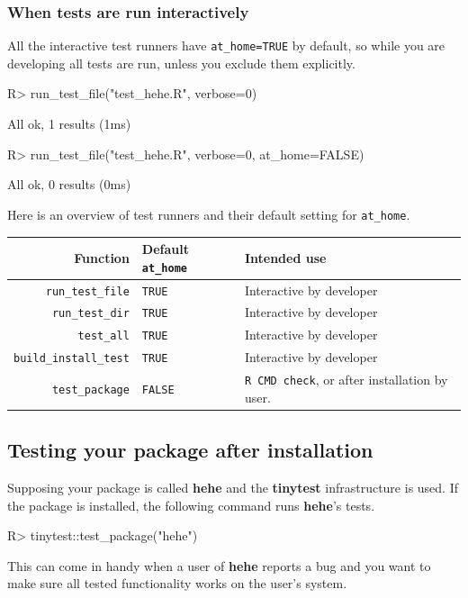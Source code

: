 \documentclass[11pt]{article}
\newcommand{\code}[1]{\texttt{#1}}
\newcommand{\pkg}[1]{\textbf{#1}}
\begin{document}
\subsubsection*{When tests are run interactively}
All the interactive test runners have \code{at\_home=TRUE} by default, so while
you are developing all tests are run, unless you exclude them explicitly.
\begin{Schunk}
\begin{Sinput}
R> run_test_file("test_hehe.R", verbose=0)
\end{Sinput}
\begin{Soutput}
All ok, 1 results (1ms)
\end{Soutput}
\begin{Sinput}
R> run_test_file("test_hehe.R", verbose=0, at_home=FALSE)
\end{Sinput}
\begin{Soutput}
All ok, 0 results (0ms)
\end{Soutput}
\end{Schunk}

Here is an overview of test runners and their default setting for \code{at\_home}.

\begin{center}
\begin{tabular}{rll}
Function               & Default \code{at\_home}  & Intended use \\
\hline
\code{run\_test\_file}      & \code{TRUE}   & Interactive by developer\\
\code{run\_test\_dir}       & \code{TRUE}   & Interactive by developer\\
\code{test\_all}            & \code{TRUE}   & Interactive by developer\\
\code{build\_install\_test} & \code{TRUE}   & Interactive by developer\\
\code{test\_package}        & \code{FALSE}  & \code{R CMD check}, or after installation by user.
\end{tabular}
\end{center}



\subsection{Testing your package after installation}
Supposing your package is called \pkg{hehe} and the \pkg{tinytest}
infrastructure is used. If the package is installed, the following command runs
\pkg{hehe}'s tests. 
\begin{Schunk}
\begin{Sinput}
R> tinytest::test_package("hehe")
\end{Sinput}
\end{Schunk}
This can come in handy when a user of \pkg{hehe} reports a bug and you want to
make sure all tested functionality works on the user's system.
\end{document}
